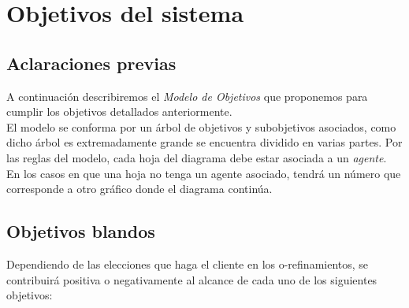 \documentclass[11pt, a4paper, spanish]{article}
\begin{document}
\newpage
	
\section{Objetivos del sistema}

\subsection{Aclaraciones previas}

	A continuaci\'on describiremos el \emph{Modelo de Objetivos} que proponemos para cumplir los objetivos detallados anteriormente.\\

	El modelo se conforma por un \'arbol de objetivos y subobjetivos asociados, como dicho \'arbol es extremadamente grande se encuentra 
	dividido en varias partes. Por las reglas del modelo, cada hoja del diagrama debe estar asociada a un \emph{agente}. En los casos en que
	una hoja no tenga un agente asociado, tendr\'a un n\'umero que corresponde a otro gr\'afico donde el diagrama contin\'ua.
	
\subsection{Objetivos blandos}

	Dependiendo de las elecciones que haga el cliente en los o-refinamientos, se contribuir\'a positiva o negativamente al alcance de cada uno de 
	los siguientes objetivos:
\end{document}
